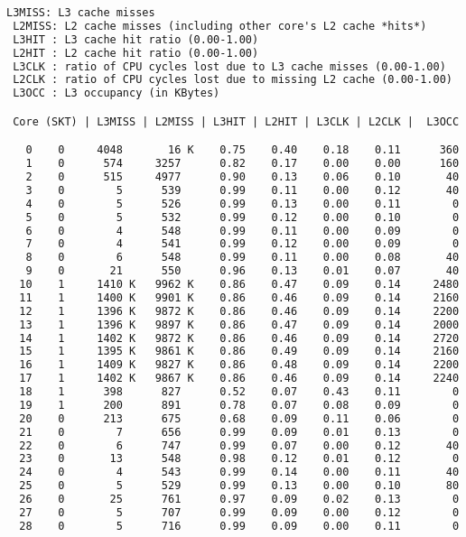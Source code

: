 \begin{lstlisting}[language=TeX]
 L3MISS: L3 cache misses 
 L2MISS: L2 cache misses (including other core's L2 cache *hits*) 
 L3HIT : L3 cache hit ratio (0.00-1.00)
 L2HIT : L2 cache hit ratio (0.00-1.00)
 L3CLK : ratio of CPU cycles lost due to L3 cache misses (0.00-1.00)
 L2CLK : ratio of CPU cycles lost due to missing L2 cache (0.00-1.00)
 L3OCC : L3 occupancy (in KBytes)

 Core (SKT) | L3MISS | L2MISS | L3HIT | L2HIT | L3CLK | L2CLK |  L3OCC

   0    0     4048       16 K    0.75    0.40    0.18    0.11      360
   1    0      574     3257      0.82    0.17    0.00    0.00      160
   2    0      515     4977      0.90    0.13    0.06    0.10       40
   3    0        5      539      0.99    0.11    0.00    0.12       40
   4    0        5      526      0.99    0.13    0.00    0.11        0
   5    0        5      532      0.99    0.12    0.00    0.10        0
   6    0        4      548      0.99    0.11    0.00    0.09        0
   7    0        4      541      0.99    0.12    0.00    0.09        0
   8    0        6      548      0.99    0.11    0.00    0.08       40
   9    0       21      550      0.96    0.13    0.01    0.07       40
  10    1     1410 K   9962 K    0.86    0.47    0.09    0.14     2480
  11    1     1400 K   9901 K    0.86    0.46    0.09    0.14     2160
  12    1     1396 K   9872 K    0.86    0.46    0.09    0.14     2200
  13    1     1396 K   9897 K    0.86    0.47    0.09    0.14     2000
  14    1     1402 K   9872 K    0.86    0.46    0.09    0.14     2720
  15    1     1395 K   9861 K    0.86    0.49    0.09    0.14     2160
  16    1     1409 K   9827 K    0.86    0.48    0.09    0.14     2200
  17    1     1402 K   9867 K    0.86    0.46    0.09    0.14     2240
  18    1      398      827      0.52    0.07    0.43    0.11        0
  19    1      200      891      0.78    0.07    0.08    0.09        0
  20    0      213      675      0.68    0.09    0.11    0.06        0
  21    0        7      656      0.99    0.09    0.01    0.13        0
  22    0        6      747      0.99    0.07    0.00    0.12       40
  23    0       13      548      0.98    0.12    0.01    0.12        0
  24    0        4      543      0.99    0.14    0.00    0.11       40
  25    0        5      529      0.99    0.13    0.00    0.10       80
  26    0       25      761      0.97    0.09    0.02    0.13        0
  27    0        5      707      0.99    0.09    0.00    0.12        0
  28    0        5      716      0.99    0.09    0.00    0.11        0

\end{lstlisting}
